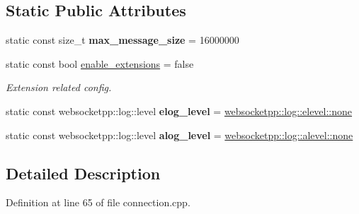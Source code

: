 \subsection*{Static Public Attributes}
\begin{DoxyCompactItemize}
\item 
static const size\+\_\+t {\bfseries max\+\_\+message\+\_\+size} = 16000000\hypertarget{structstub__config_af3bff8827bb7bc7b89bff020d6a1fa67}{}\label{structstub__config_af3bff8827bb7bc7b89bff020d6a1fa67}

\item 
static const bool \hyperlink{structstub__config_a10cfb6ee6ff233ac4581d3201a324684}{enable\+\_\+extensions} = false\hypertarget{structstub__config_a10cfb6ee6ff233ac4581d3201a324684}{}\label{structstub__config_a10cfb6ee6ff233ac4581d3201a324684}

\begin{DoxyCompactList}\small\item\em Extension related config. \end{DoxyCompactList}\item 
static const websocketpp\+::log\+::level {\bfseries elog\+\_\+level} = \hyperlink{structwebsocketpp_1_1log_1_1elevel_ae86395aa26ec2089e07fd63b62a549fa}{websocketpp\+::log\+::elevel\+::none}\hypertarget{structstub__config_ac5b2f2f262b0cb3ba69bc1dc39b3d251}{}\label{structstub__config_ac5b2f2f262b0cb3ba69bc1dc39b3d251}

\item 
static const websocketpp\+::log\+::level {\bfseries alog\+\_\+level} = \hyperlink{structwebsocketpp_1_1log_1_1alevel_a4cf0520816094999975fe73081cf30f2}{websocketpp\+::log\+::alevel\+::none}\hypertarget{structstub__config_a65beba835b80790d444437f56c4420f0}{}\label{structstub__config_a65beba835b80790d444437f56c4420f0}

\end{DoxyCompactItemize}


\subsection{Detailed Description}


Definition at line 65 of file connection.\+cpp.



